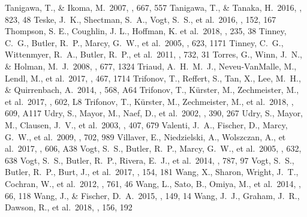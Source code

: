 \documentclass[twocolumn]{aastex62}
\begin{document}
\begin{CJK*}{UTF8}{min}
\begin{thebibliography}{}
 Tanigawa, T., \& Ikoma, M.\ 2007, \apj, 667, 557
 Tanigawa, T., \& Tanaka, H.\ 2016, \apj, 823, 48
 Teske, J.~K., Shectman, S.~A., Vogt, S.~S., et al.\ 2016, \aj, 152, 167
 Thompson, S. E., Coughlin, J. L., Hoffman, K. et al.\ 2018, \apjs, 235, 38
 Tinney, C.~G., Butler, R.~P., Marcy, G.~W., et al.\ 2005, \apj, 623, 1171
 Tinney, C.~G., Wittenmyer, R.~A., Butler, R.~P., et al.\ 2011, \apj, 732, 31
 Torres, G., Winn, J.~N., \& Holman, M.~J.\ 2008, \apj, 677, 1324
 Triaud, A.~H.~M.~J., Neveu-VanMalle, M., Lendl, M., et al.\ 2017, \mnras, 467, 1714
 Trifonov, T., Reffert, S., Tan, X., Lee, M.~H., \& Quirrenbach, A.\ 2014, \aap, 568, A64
 Trifonov, T., K{\"u}rster, M., Zechmeister, M., et al.\ 2017, \aap, 602, L8
 Trifonov, T., K{\"u}rster, M., Zechmeister, M., et al.\ 2018, \aap, 609, A117
 Udry, S., Mayor, M., Naef, D., et al.\ 2002, \aap, 390, 267
 Udry, S., Mayor, M., Clausen, J.~V., et al.\ 2003, \aap, 407, 679
 Valenti, J.~A., Fischer, D., Marcy, G.~W., et al.\ 2009, \apj, 702, 989
 Villaver, E., Niedzielski, A., Wolszczan, A., et al.\ 2017, \aap, 606, A38
 Vogt, S.~S., Butler, R.~P., Marcy, G.~W., et al.\ 2005, \apj, 632, 638
 Vogt, S.~S., Butler, R.~P., Rivera, E.~J., et al.\ 2014, \apj, 787, 97
 Vogt, S.~S., Butler, R.~P., Burt, J., et al.\ 2017, \aj, 154, 181
 Wang, X., Sharon, Wright, J.~T., Cochran, W., et al.\ 2012, \apj, 761, 46
 Wang, L., Sato, B., Omiya, M., et al.\ 2014, \pasj, 66, 118
 Wang, J., \& Fischer, D.~A.\ 2015, \aj, 149, 14
 Wang, J.~J., Graham, J.~R., Dawson, R., et al.\ 2018, \aj, 156, 192

\end{thebibliography}
\end{CJK*}
\end{document}
